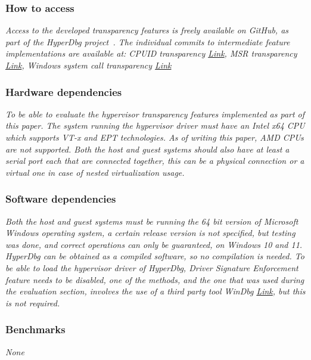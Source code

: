 \subsubsection{How to access}
\textit{Access to the developed transparency features is freely available on GitHub, as part of the HyperDbg project~\cite{hyperdbg}. 
The individual commits to intermediate feature implementations are available at: CPUID transparency \href{https://github.com/HyperDbg/HyperDbg/commit/56c2d400fddca22f314c1e5d16cadce6950eb262}{Link}, 
MSR transparency \href{https://github.com/HyperDbg/HyperDbg/commit/2cc3da3daebd793fd56d5c370ef6da398efa6d29}{Link}, Windows system call
transparency \href{https://github.com/HyperDbg/HyperDbg/commit/d0610661baf944259c33e921d3fc265e6a217ad8}{Link}
}


\subsubsection{Hardware dependencies}
\textit{To be able to evaluate the hypervisor transparency features implemented as part of this paper.
The system running the hypervisor driver must have an Intel x64 CPU which supports VT-x and EPT technologies. As of writing this paper, AMD CPUs are not supported.
Both the host and guest systems should also have at least a serial port each that are connected together, this can be a physical connection or a virtual one in case of nested virtualization usage.}

\subsubsection{Software dependencies}
\textit{Both the host and guest systems must be running the 64 bit version of Microsoft Windows operating system,
a certain release version is not specified, but testing was done, and correct operations can only be guaranteed, on Windows 10 and 11.
HyperDbg can be obtained as a compiled software, so no compilation is needed. To be able to load the hypervisor driver of HyperDbg,
Driver Signature Enforcement feature needs to be disabled, one of the methods, and the one that was used during the evaluation section, involves the use of a third party tool WinDbg \href{https://github.com/HyperDbg/HyperDbg/commit/2cc3da3daebd793fd56d5c370ef6da398efa6d29}{Link}, but this is not required.}

\subsubsection{Benchmarks}
\textit{None}

